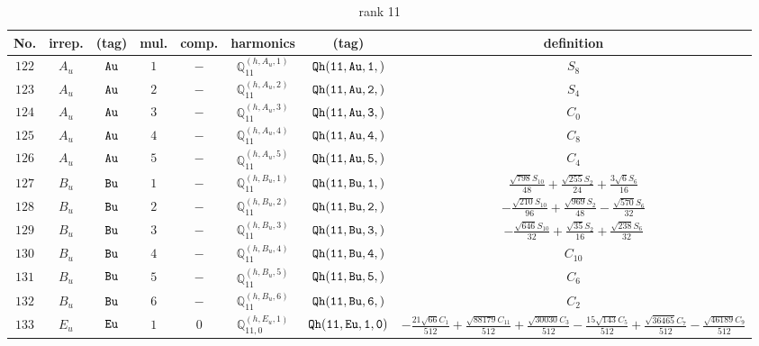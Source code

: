 \documentclass[fleqn,8pt]{jsarticle}
\begin{document}
\begin{table}[ht!]
\begin{center}
\caption{rank 11}
\renewcommand{\arraystretch}{1.3}
\begin{tabular}{cccccccc} \hline \hline
No. & irrep. & (tag) & mul. & comp. & harmonics & (tag) & definition \\ \hline
$ 122 $ & $ A_{u} $ & $ {\tt Au} $ & $ 1 $ & $ - $ & $ \mathbb{Q}_{11}^{(h,A_{u},1)} $ & $ {\tt Qh(11,Au,1,)} $ & $ S_{8} $ \\
$ 123 $ & $ A_{u} $ & $ {\tt Au} $ & $ 2 $ & $ - $ & $ \mathbb{Q}_{11}^{(h,A_{u},2)} $ & $ {\tt Qh(11,Au,2,)} $ & $ S_{4} $ \\
$ 124 $ & $ A_{u} $ & $ {\tt Au} $ & $ 3 $ & $ - $ & $ \mathbb{Q}_{11}^{(h,A_{u},3)} $ & $ {\tt Qh(11,Au,3,)} $ & $ C_{0} $ \\
$ 125 $ & $ A_{u} $ & $ {\tt Au} $ & $ 4 $ & $ - $ & $ \mathbb{Q}_{11}^{(h,A_{u},4)} $ & $ {\tt Qh(11,Au,4,)} $ & $ C_{8} $ \\
$ 126 $ & $ A_{u} $ & $ {\tt Au} $ & $ 5 $ & $ - $ & $ \mathbb{Q}_{11}^{(h,A_{u},5)} $ & $ {\tt Qh(11,Au,5,)} $ & $ C_{4} $ \\
$ 127 $ & $ B_{u} $ & $ {\tt Bu} $ & $ 1 $ & $ - $ & $ \mathbb{Q}_{11}^{(h,B_{u},1)} $ & $ {\tt Qh(11,Bu,1,)} $ & $ \frac{\sqrt{798} S_{10}}{48} + \frac{\sqrt{255} S_{2}}{24} + \frac{3 \sqrt{6} S_{6}}{16} $ \\
$ 128 $ & $ B_{u} $ & $ {\tt Bu} $ & $ 2 $ & $ - $ & $ \mathbb{Q}_{11}^{(h,B_{u},2)} $ & $ {\tt Qh(11,Bu,2,)} $ & $ - \frac{\sqrt{210} S_{10}}{96} + \frac{\sqrt{969} S_{2}}{48} - \frac{\sqrt{570} S_{6}}{32} $ \\
$ 129 $ & $ B_{u} $ & $ {\tt Bu} $ & $ 3 $ & $ - $ & $ \mathbb{Q}_{11}^{(h,B_{u},3)} $ & $ {\tt Qh(11,Bu,3,)} $ & $ - \frac{\sqrt{646} S_{10}}{32} + \frac{\sqrt{35} S_{2}}{16} + \frac{\sqrt{238} S_{6}}{32} $ \\
$ 130 $ & $ B_{u} $ & $ {\tt Bu} $ & $ 4 $ & $ - $ & $ \mathbb{Q}_{11}^{(h,B_{u},4)} $ & $ {\tt Qh(11,Bu,4,)} $ & $ C_{10} $ \\
$ 131 $ & $ B_{u} $ & $ {\tt Bu} $ & $ 5 $ & $ - $ & $ \mathbb{Q}_{11}^{(h,B_{u},5)} $ & $ {\tt Qh(11,Bu,5,)} $ & $ C_{6} $ \\
$ 132 $ & $ B_{u} $ & $ {\tt Bu} $ & $ 6 $ & $ - $ & $ \mathbb{Q}_{11}^{(h,B_{u},6)} $ & $ {\tt Qh(11,Bu,6,)} $ & $ C_{2} $ \\
$ 133 $ & $ E_{u} $ & $ {\tt Eu} $ & $ 1 $ & $ 0 $ & $ \mathbb{Q}_{11,0}^{(h,E_{u},1)} $ & $ {\tt Qh(11,Eu,1,0)} $ & $ - \frac{21 \sqrt{66} C_{1}}{512} + \frac{\sqrt{88179} C_{11}}{512} + \frac{\sqrt{30030} C_{3}}{512} - \frac{15 \sqrt{143} C_{5}}{512} + \frac{\sqrt{36465} C_{7}}{512} - \frac{\sqrt{46189} C_{9}}{512} $ \\

\end{tabular}
\end{center}
\end{table}
\end{document}

